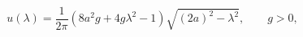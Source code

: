 \begin{equation}
    u(\lambda)=\frac{1}{2\pi}\left(8a^2g+4g\lambda^2-1\right)\sqrt{(2a)^2-\lambda^2},\qquad
    g>0,
\end{equation}

